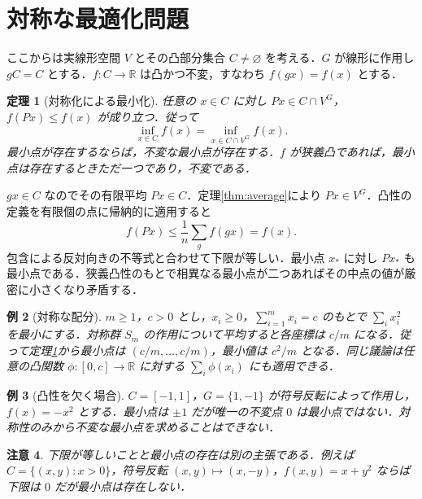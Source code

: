 \documentclass[a5paper,10pt,onecolumn]{jsarticle}
\makeatletter
\theoremstyle{mathnotetheorem}
\newtheorem{theorem}{定理}[section]
\newtheorem{example}[theorem]{例}
\newtheorem{remark}[theorem]{注意}
\renewcommand{\proofname}{証明}
\renewenvironment{proof}[1][\proofname]{%
  \par\pushQED{\qed}\normalfont\topsep4\p@\@plus2\p@\relax
  \trivlist\item[\hskip\labelsep\bfseries #1]\ignorespaces
}{\popQED\endtrivlist\@endpefalse}
\newcommand{\R}{\mathbb{R}}
\makeatother
\begin{document}
\section{対称な最適化問題}
ここからは実線形空間 $V$ とその凸部分集合 $C\ne\varnothing$ を考える．$G$ が線形に作用し $gC=C$ とする．$f:C\to\R$ は凸かつ不変，すなわち $f(gx)=f(x)$ とする．
\begin{theorem}[対称化による最小化]\label{thm:convex}
任意の $x\in C$ に対し $Px\in C\cap V^G$，$f(Px)\le f(x)$ が成り立つ．従って
\[
 \inf_{x\in C}f(x)=\inf_{x\in C\cap V^G}f(x).
\]
最小点が存在するならば，不変な最小点が存在する．$f$ が狭義凸であれば，最小点は存在するときただ一つであり，不変である．
\end{theorem}
\begin{proof}
$gx\in C$ なのでその有限平均 $Px\in C$．定理\ref{thm:average}により $Px\in V^G$．凸性の定義を有限個の点に帰納的に適用すると
\[
 f(Px)\le\frac1n\sum_g f(gx)=f(x).
\]
包含による反対向きの不等式と合わせて下限が等しい．最小点 $x_*$ に対し $Px_*$ も最小点である．狭義凸性のもとで相異なる最小点が二つあればその中点の値が厳密に小さくなり矛盾する．
\end{proof}
\begin{example}[対称な配分]
$m\ge1$，$c>0$ とし，$x_i\ge0$，$\sum_{i=1}^m x_i=c$ のもとで $\sum_i x_i^2$ を最小にする．対称群 $S_m$ の作用について平均すると各座標は $c/m$ になる．従って定理\ref{thm:convex}から最小点は $(c/m,\ldots,c/m)$，最小値は $c^2/m$ となる．同じ議論は任意の凸関数 $\phi:[0,c]\to\R$ に対する $\sum_i\phi(x_i)$ にも適用できる．
\end{example}
\begin{example}[凸性を欠く場合]
$C=[-1,1]$，$G=\{1,-1\}$ が符号反転によって作用し，$f(x)=-x^2$ とする．最小点は $\pm1$ だが唯一の不変点 $0$ は最小点ではない．対称性のみから不変な最小点を求めることはできない．
\end{example}
\begin{remark}
下限が等しいことと最小点の存在は別の主張である．例えば $C=\{(x,y):x>0\}$，符号反転 $(x,y)\mapsto(x,-y)$，$f(x,y)=x+y^2$ ならば下限は $0$ だが最小点は存在しない．
\end{remark}
\end{document}
